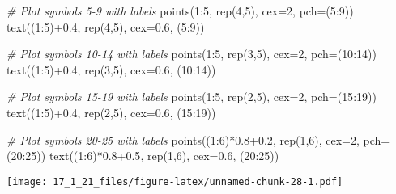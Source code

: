 \documentclass[
]{article}
\newenvironment{Shaded}{\begin{snugshade}}{\end{snugshade}}
\newcommand{\AttributeTok}[1]{\textcolor[rgb]{0.77,0.63,0.00}{#1}}
\newcommand{\CommentTok}[1]{\textcolor[rgb]{0.56,0.35,0.01}{\textit{#1}}}
\newcommand{\DecValTok}[1]{\textcolor[rgb]{0.00,0.00,0.81}{#1}}
\newcommand{\FloatTok}[1]{\textcolor[rgb]{0.00,0.00,0.81}{#1}}
\newcommand{\FunctionTok}[1]{\textcolor[rgb]{0.00,0.00,0.00}{#1}}
\newcommand{\NormalTok}[1]{#1}
\newcommand{\SpecialCharTok}[1]{\textcolor[rgb]{0.00,0.00,0.00}{#1}}
\begin{document}
\begin{Shaded}
\begin{Highlighting}[]
\CommentTok{\# Plot symbols 5{-}9 with labels}
\FunctionTok{points}\NormalTok{(}\DecValTok{1}\SpecialCharTok{:}\DecValTok{5}\NormalTok{, }\FunctionTok{rep}\NormalTok{(}\DecValTok{4}\NormalTok{,}\DecValTok{5}\NormalTok{), }\AttributeTok{cex=}\DecValTok{2}\NormalTok{, }\AttributeTok{pch=}\NormalTok{(}\DecValTok{5}\SpecialCharTok{:}\DecValTok{9}\NormalTok{))}
\FunctionTok{text}\NormalTok{((}\DecValTok{1}\SpecialCharTok{:}\DecValTok{5}\NormalTok{)}\SpecialCharTok{+}\FloatTok{0.4}\NormalTok{, }\FunctionTok{rep}\NormalTok{(}\DecValTok{4}\NormalTok{,}\DecValTok{5}\NormalTok{), }\AttributeTok{cex=}\FloatTok{0.6}\NormalTok{, (}\DecValTok{5}\SpecialCharTok{:}\DecValTok{9}\NormalTok{))}

\CommentTok{\# Plot symbols 10{-}14 with labels}
\FunctionTok{points}\NormalTok{(}\DecValTok{1}\SpecialCharTok{:}\DecValTok{5}\NormalTok{, }\FunctionTok{rep}\NormalTok{(}\DecValTok{3}\NormalTok{,}\DecValTok{5}\NormalTok{), }\AttributeTok{cex=}\DecValTok{2}\NormalTok{, }\AttributeTok{pch=}\NormalTok{(}\DecValTok{10}\SpecialCharTok{:}\DecValTok{14}\NormalTok{))}
\FunctionTok{text}\NormalTok{((}\DecValTok{1}\SpecialCharTok{:}\DecValTok{5}\NormalTok{)}\SpecialCharTok{+}\FloatTok{0.4}\NormalTok{, }\FunctionTok{rep}\NormalTok{(}\DecValTok{3}\NormalTok{,}\DecValTok{5}\NormalTok{), }\AttributeTok{cex=}\FloatTok{0.6}\NormalTok{, (}\DecValTok{10}\SpecialCharTok{:}\DecValTok{14}\NormalTok{))}

\CommentTok{\# Plot symbols 15{-}19 with labels}
\FunctionTok{points}\NormalTok{(}\DecValTok{1}\SpecialCharTok{:}\DecValTok{5}\NormalTok{, }\FunctionTok{rep}\NormalTok{(}\DecValTok{2}\NormalTok{,}\DecValTok{5}\NormalTok{), }\AttributeTok{cex=}\DecValTok{2}\NormalTok{, }\AttributeTok{pch=}\NormalTok{(}\DecValTok{15}\SpecialCharTok{:}\DecValTok{19}\NormalTok{))}
\FunctionTok{text}\NormalTok{((}\DecValTok{1}\SpecialCharTok{:}\DecValTok{5}\NormalTok{)}\SpecialCharTok{+}\FloatTok{0.4}\NormalTok{, }\FunctionTok{rep}\NormalTok{(}\DecValTok{2}\NormalTok{,}\DecValTok{5}\NormalTok{), }\AttributeTok{cex=}\FloatTok{0.6}\NormalTok{, (}\DecValTok{15}\SpecialCharTok{:}\DecValTok{19}\NormalTok{))}

\CommentTok{\# Plot symbols 20{-}25 with labels}
\FunctionTok{points}\NormalTok{((}\DecValTok{1}\SpecialCharTok{:}\DecValTok{6}\NormalTok{)}\SpecialCharTok{*}\FloatTok{0.8+0.2}\NormalTok{, }\FunctionTok{rep}\NormalTok{(}\DecValTok{1}\NormalTok{,}\DecValTok{6}\NormalTok{), }\AttributeTok{cex=}\DecValTok{2}\NormalTok{, }\AttributeTok{pch=}\NormalTok{(}\DecValTok{20}\SpecialCharTok{:}\DecValTok{25}\NormalTok{))}
\FunctionTok{text}\NormalTok{((}\DecValTok{1}\SpecialCharTok{:}\DecValTok{6}\NormalTok{)}\SpecialCharTok{*}\FloatTok{0.8+0.5}\NormalTok{, }\FunctionTok{rep}\NormalTok{(}\DecValTok{1}\NormalTok{,}\DecValTok{6}\NormalTok{), }\AttributeTok{cex=}\FloatTok{0.6}\NormalTok{, (}\DecValTok{20}\SpecialCharTok{:}\DecValTok{25}\NormalTok{))}
\end{Highlighting}
\end{Shaded}

\texttt{[image: 17\_1\_21\_files/figure-latex/unnamed-chunk-28-1.pdf]}
\end{document}
